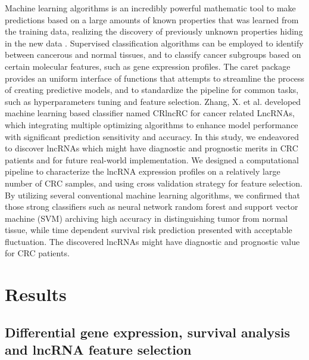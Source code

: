 \documentclass[fleqn,10pt]{wlscirep}
\begin{document}
Machine learning algorithms is an incredibly powerful mathematic tool to make predictions based on a large amounts of known properties that was learned from the training data, realizing the discovery of previously unknown properties hiding in the new data \cite{RN13,RN14}. Supervised classification algorithms can be employed to identify between cancerous and normal tissues, and to classify cancer subgroups based on certain molecular features, such as gene expression profiles\cite{RN15}. The caret package provides an uniform interface of functions that attempts to streamline the process of creating predictive models, and to standardize the pipeline for common tasks, such as hyperparameters tuning and feature selection\cite{RN16}. Zhang, X. et al.\cite{RN17} developed machine learning based classifier named CRlncRC for cancer related LncRNAs, which integrating multiple optimizing algorithms to enhance model performance with significant prediction sensitivity and accuracy. In this study, we endeavored to discover lncRNAs which might have diagnostic and prognostic merits in CRC patients and for future real-world implementation. We designed a computational pipeline to characterize the lncRNA expression profiles on a relatively large number of CRC samples, and using cross validation strategy for feature selection. By utilizing several conventional machine learning algorithms, we confirmed that those strong classifiers such as neural network random forest and support vector machine (SVM) archiving high accuracy in distinguishing tumor from normal tissue, while time dependent survival risk prediction presented with acceptable fluctuation. The discovered lncRNAs might have diagnostic and prognostic value for CRC patients.

\section*{Results}

\subsection*{Differential gene expression, survival analysis and lncRNA feature selection }
\end{document}
